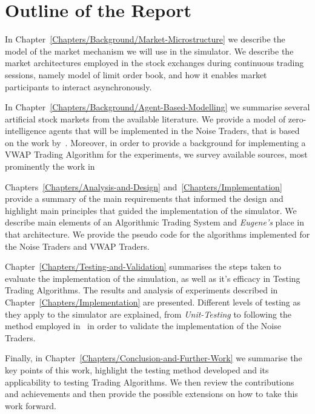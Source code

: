 \section{Outline of the Report \label{Chapters/Introduction/Outline}}

In Chapter~\ref{Chapters/Background/Market-Microstructure} we describe the model of the market mechanism we will use in the simulator. We describe the market architectures employed in the stock exchanges during continuous trading sessions, namely model of limit order book, and how it enables market participants to interact asynchronously.

In Chapter~\ref{Chapters/Background/Agent-Based-Modelling} we summarise several artificial stock markets from the available literature. We provide a model of zero-intelligence agents that will be implemented in the Noise Traders, that is based on the work by~\citet[chap.~4]{Gilles2006}. Moreover, in order to provide a background for implementing a VWAP Trading Algorithm for the experiments, we survey available sources, most prominently the work in~\cite{Coggins2006, Kakade2004} 

Chapters~\ref{Chapters/Analysis-and-Design} and~\ref{Chapters/Implementation} provide a summary of the main requirements that informed the design and highlight main principles that guided the implementation of the simulator. We describe main elements of an Algorithmic Trading System and \textit{Eugene's} place in that architecture. We provide the pseudo code for the algorithms implemented for the Noise Traders and VWAP Traders.

Chapter~\ref{Chapters/Testing-and-Validation} summarises the steps taken to evaluate the implementation of the simulation, as well as it's efficacy in Testing Trading Algorithms. The results and analysis of experiments described in Chapter~\ref{Chapters/Implementation} are presented. Different levels of testing as they apply to the simulator are explained, from \textit{Unit-Testing} to following the method employed in~\cite[chap.~4]{Gilles2006} in order to validate the implementation of the Noise Traders.

Finally, in Chapter~\ref{Chapters/Conclusion-and-Further-Work} we summarise the key points of this work, highlight the testing method developed and its applicability to testing Trading Algorithms. We then review the contributions and achievements and then provide the possible extensions on how to take this work forward.



